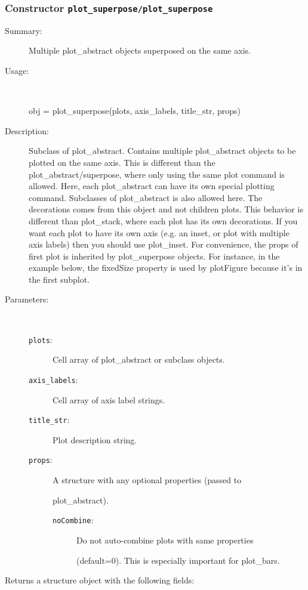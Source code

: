 \subsubsection[Constructor \texttt{plot\_superpose}]{Constructor \texttt{plot\_superpose/plot\_superpose}}%
%
\label{ref_plot_superpose__plot_superpose}%
\hypertarget{ref_plot_superpose__plot_superpose}{}%
\begin{description}
\item[Summary:]Multiple plot\_abstract objects superposed on the same axis.
%
\item[Usage:]~%
\begin{lyxcode}%
obj = plot\_superpose(plots, axis\_labels, title\_str, props)
%
\end{lyxcode}%
%
\item[Description:]%
Subclass of plot\_abstract. Contains multiple plot\_abstract objects to be
 plotted on the same axis. This is different than the
 plot\_abstract/superpose, where only using the same plot command is
 allowed.  Here, each plot\_abstract can have its own special plotting
 command. Subclasses of plot\_abstract is also allowed here. The decorations
 comes from this object and not children plots. This behavior is different
 than plot\_stack, where each plot has its own decorations. If you want each
 plot to have its own axis (e.g. an inset, or plot with multiple axis
 labels) then you should use plot\_inset. For convenience, the props of
 first plot is inherited by plot\_superpose objects. For instance, in the
 example below, the fixedSize property is used by plotFigure because
 it's in the first subplot.
\item[Parameters:]~
\begin{description}%
\item[\texttt{plots}:]
 Cell array of plot\_abstract or subclass objects.
\item[\texttt{axis\_labels}:]
 Cell array of axis label strings.
\item[\texttt{title\_str}:]
 Plot description string.
\item[\texttt{props}:]
 A structure with any optional properties (passed to

plot\_abstract).
\begin{description}%
\item[\texttt{noCombine}:]
 Do not auto-combine plots with same properties

(default=0). This is especially important for plot\_bars.
\end{description}%
\end{description}%
%
\item[Returns a structure object with the following fields:
]~


\end{description}
